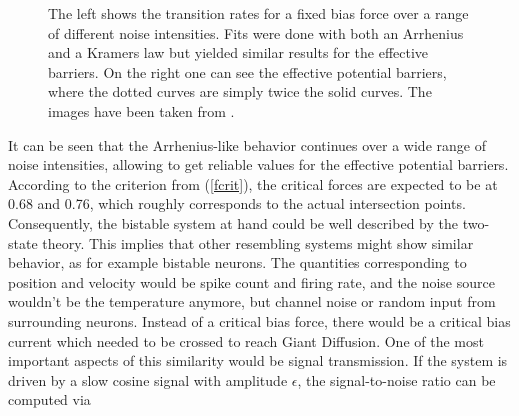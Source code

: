 \documentclass[12pt,a4paper]{article}
\begin{document}
\begin{figure}[H]
	\caption{The left shows the transition rates for a fixed bias force over a range of different noise intensities. Fits were done with both an Arrhenius and a Kramers law but yielded similar results for the effective barriers. On the right one can see the effective potential barriers, where the dotted curves are simply twice the solid curves.  The images have been taken from \cite{bpp}.}
	\label{ratesintro} 
\end{figure}
It can be seen that the Arrhenius-like behavior continues over a wide range of noise intensities, allowing to get reliable values for the effective potential barriers. According to the criterion from (\ref{fcrit}), the critical forces are expected to be at 0.68 and 0.76, which roughly corresponds to the actual intersection points.\\
Consequently, the bistable system at hand could be well described by the two-state theory. This implies that other resembling systems might show similar behavior, as for example bistable neurons. The quantities corresponding to position and velocity would be spike count and firing rate, and the noise source wouldn't be the temperature anymore, but channel noise or random input from surrounding neurons.
Instead of a critical bias force, there would be a critical bias current which needed to be crossed to reach Giant Diffusion. One of the most important aspects of this similarity would be signal transmission. If the system is driven by a slow cosine signal with amplitude $\epsilon$, the signal-to-noise ratio can be computed via
\end{document}
